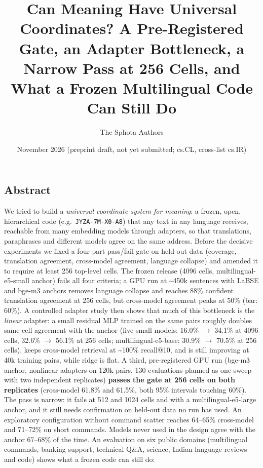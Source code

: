 \documentclass[
  10pt,
]{article}
\title{Can Meaning Have Universal Coordinates? A Pre-Registered Gate, an
Adapter Bottleneck, a Narrow Pass at 256 Cells, and What a Frozen
Multilingual Code Can Still Do}
\author{The Sphota Authors}
\date{November 2026 (preprint draft, not yet submitted; cs.CL,
cross-list cs.IR)}
\begin{document}
\maketitle

\hypertarget{abstract}{%
\subsection{Abstract}\label{abstract}}

We tried to build a \emph{universal coordinate system for meaning}: a
frozen, open, hierarchical code (e.g.~\texttt{JYZA-7M-X0-A8}) that any
text in any language receives, reachable from many embedding models
through adapters, so that translations, paraphrases and different models
agree on the same address. Before the decisive experiments we fixed a
four-part pass/fail gate on held-out data (coverage, translation
agreement, cross-model agreement, language collapse) and amended it to
require at least 256 top-level cells. The frozen release (4096 cells,
multilingual-e5-small anchor) fails all four criteria; a GPU run at
\textasciitilde450k sentences with LaBSE and bge-m3 anchors removes
language collapse and reaches 88\% confident translation agreement at
256 cells, but cross-model agreement peaks at 50\% (bar: 60\%). A
controlled adapter study then shows that much of this bottleneck is the
\emph{linear} adapter: a small residual MLP trained on the same pairs
roughly doubles same-cell agreement with the anchor (five small models:
16.0\% $\rightarrow$ 34.1\% at 4096 cells, 32.6\% $\rightarrow$ 56.1\% at 256 cells;
multilingual-e5-base: 30.9\% $\rightarrow$ 70.5\% at 256 cells), keeps cross-model
retrieval at \textasciitilde100\% recall@10, and is still improving at
40k training pairs, while ridge is flat. A third, pre-registered GPU run
(bge-m3 anchor, nonlinear adapters on 120k pairs, 130 evaluations
planned as one sweep with two independent replicates) \textbf{passes the
gate at 256 cells on both replicates} (cross-model 61.8\% and 61.5\%,
both 95\% intervals touching 60\%). The pass is narrow: it fails at 512
and 1024 cells and with a multilingual-e5-large anchor, and it still
needs confirmation on held-out data no run has used. An exploratory
configuration without command scatter reaches 64--65\% cross-model and
71--72\% on short commands. Models never used in the design agree with
the anchor 67--68\% of the time. An evaluation on six public domains
(multilingual commands, banking support, technical Q\&A, science,
Indian-language reviews and code) shows what a frozen code can still do:
\end{document}
